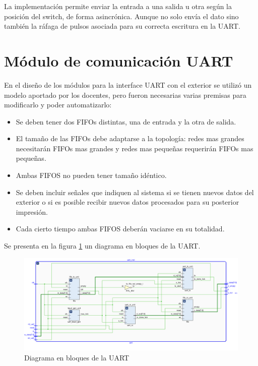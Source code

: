 		\vspace{10cm} 
		
		La implementación permite enviar la entrada a una salida u otra según la posición del switch, de forma asincrónica. Aunque no solo envía el dato sino también la ráfaga de pulsos asociada para su correcta escritura en la UART.
		
\section{Módulo de comunicación UART}

	En el diseño de los módulos para la interface UART con el exterior se utilizó un modelo  aportado por los docentes, pero fueron necesarias varias premisas para modificarlo y poder automatizarlo:
	
	\begin{itemize}
		\item Se deben tener dos FIFOs distintas, una de entrada y la otra de salida.
		\item El tamaño de las FIFOs debe adaptarse a la topología: redes mas grandes necesitarán FIFOs mas grandes y redes mas pequeñas requerirán FIFOs mas pequeñas.
		\item Ambas FIFOS no pueden tener tamaño idéntico.
		\item Se deben incluir señales que indiquen al sistema si se tienen nuevos datos del exterior o si es posible recibir nuevos datos procesados para su posterior impresión.
		\item Cada cierto tiempo ambas FIFOS deberán vaciarse en su totalidad.		
	\end{itemize}
	
		Se presenta en la figura \ref{fig:FSMD_UART} un diagrama en bloques de la UART.
			
		\begin{figure}[h]
		\centering
		\includegraphics[scale=.35]{./Figures/UART}
			\caption{Diagrama en bloques de la UART}
			\label{fig:FSMD_UART}
		\end{figure}

